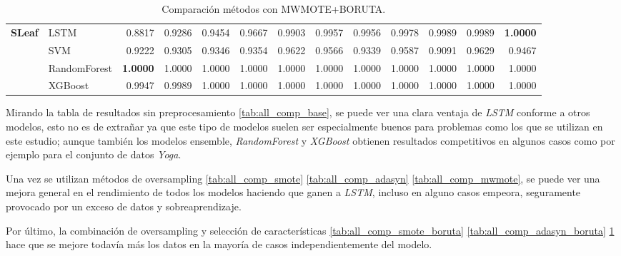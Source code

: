 \begin{table}[h]
\begin{adjustbox}{max width=15cm}
\begin{tabular}{|c|l|r|r|r|r|r|r|r|r|r|r|r|}
				\hline
				\textbf{SLeaf} & LSTM &  0.8817 &  0.9286 &  0.9454 &  0.9667 &  0.9903 &  0.9957 &  0.9956 &  0.9978 &  0.9989 &  0.9989 &  \textbf{1.0000} \\
				& SVM &  0.9222 &  0.9305 &  0.9346 &  0.9354 &  0.9622 &  0.9566 &  0.9339 &  0.9587 &  0.9091 &  0.9629 &  0.9467 \\
				& RandomForest &  \textbf{1.0000} &  1.0000 &  1.0000 &  1.0000 &  1.0000 &  1.0000 &  1.0000 &  1.0000 &  1.0000 &  1.0000 &  1.0000 \\
				& XGBoost &  0.9947 &  0.9989 &  1.0000 &  1.0000 &  1.0000 &  1.0000 &  1.0000 &  1.0000 &  1.0000 &  1.0000 &  1.0000 \\
				\hline
\end{tabular}
\end{adjustbox}
\caption{Comparación métodos con MWMOTE+BORUTA.}
\label{tab:all_comp_mwmote_boruta}
\end{table}
\newpage

Mirando la tabla de resultados sin preprocesamiento \ref{tab:all_comp_base}, se puede ver una clara ventaja de \textit{LSTM} conforme a otros modelos, esto no es de extrañar ya que este tipo de modelos suelen ser especialmente buenos para problemas como los que se utilizan en este estudio; aunque también los modelos ensemble, \textit{RandomForest} y \textit{XGBoost} obtienen resultados competitivos en algunos casos como por ejemplo para el conjunto de datos \textit{Yoga}.\newline

Una vez se utilizan métodos de oversampling \ref{tab:all_comp_smote} \ref{tab:all_comp_adasyn} \ref{tab:all_comp_mwmote}, se puede ver una mejora general en el rendimiento de todos los modelos haciendo que ganen a \textit{LSTM}, incluso en alguno casos empeora, seguramente provocado por un exceso de datos y sobreaprendizaje.\newline

Por último, la combinación de oversampling y selección de características \ref{tab:all_comp_smote_boruta} \ref{tab:all_comp_adasyn_boruta} \ref{tab:all_comp_mwmote_boruta} hace que se mejore todavía más los datos en la mayoría de casos independientemente del modelo.

